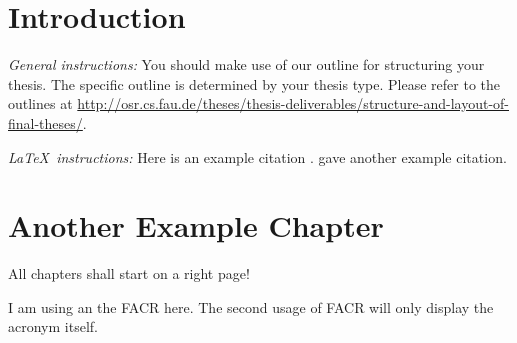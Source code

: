 \chapter{Introduction}
\label{chapter:example}

{\textsl{General instructions:}} 
You should make use of our outline for structuring your
thesis. The specific outline is determined by your thesis type.
Please refer to the outlines at 
\url{http://osr.cs.fau.de/theses/thesis-deliverables/structure-and-layout-of-final-theses/}.

{\textsl{\LaTeX\ instructions:}} Here is an example citation
\autocite{riehle:2011:controlling}.
\textcite{riehle:2007:economic} gave another example citation.


\chapter{Another Example Chapter}
\label{cahpter:another-example}

All chapters shall start on a right page!

I am using an the \ac{FACR} here. The second usage of \ac{FACR} will only display the acronym itself.